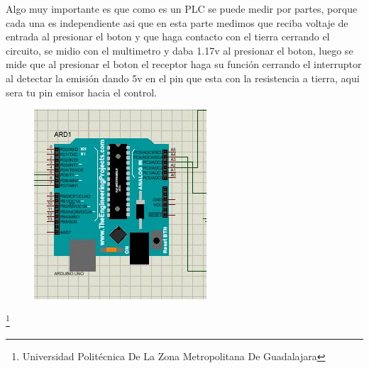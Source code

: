\documentclass[10pt,a4paper]{article}
\begin{document}
Algo muy importante es que como es un PLC se puede medir por partes, porque cada una es independiente asi que en esta parte medimos que reciba voltaje de entrada al presionar el boton y que haga contacto con el tierra cerrando el circuito, se midio con el multimetro y daba 1.17v al presionar el boton, luego se mide que al presionar el boton el receptor haga su función cerrando el interruptor al detectar la emisión dando 5v en el pin que esta con la resistencia a tierra, aqui sera tu pin emisor hacia el control.

\begin{figure}[hbtp]
\centering
\includegraphics[scale=0.60]{arduino.png} 
\end{figure}


\footnote{Universidad Politécnica De La Zona Metropolitana De Guadalajara}

\newpage
\end{document}
